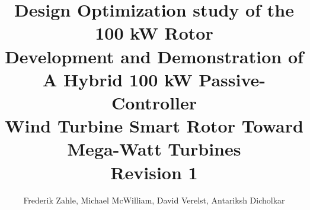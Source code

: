 \documentclass[
oneside,
paper=a4,
fontsize=9pt,
parskip=half,        %
DIV=12,              %
BCOR=10mm,           %
headings=normal,
appendixprefix=true, %
]{scrbook}			%
\begin{document}
\title{Design Optimization study of the 100 kW Rotor\\
\vspace{0.5cm}
Development and Demonstration of A Hybrid 100 kW Passive-Controller\\
Wind Turbine Smart Rotor Toward Mega-Watt Turbines\\
Revision 1}
\vspace{0.5cm}
\author{Frederik Zahle, Michael McWilliam, David Verelst, Antariksh Dicholkar}

\maketitle


\tableofcontents



\clearpage

\clearpage

%
\clearpage

%



\end{document}
